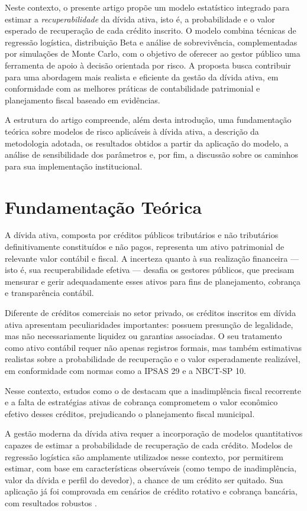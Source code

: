 \documentclass[a4paper,12pt]{article}
\begin{document}
Neste contexto, o presente artigo propõe um modelo estatístico integrado para estimar a \textit{recuperabilidade} da dívida ativa, isto é, a probabilidade e o valor esperado de recuperação de cada crédito inscrito. O modelo combina técnicas de regressão logística, distribuição Beta e análise de sobrevivência, complementadas por simulações de Monte Carlo, com o objetivo de oferecer ao gestor público uma ferramenta de apoio à decisão orientada por risco. A proposta busca contribuir para uma abordagem mais realista e eficiente da gestão da dívida ativa, em conformidade com as melhores práticas de contabilidade patrimonial e planejamento fiscal baseado em evidências.

A estrutura do artigo compreende, além desta introdução, uma fundamentação teórica sobre modelos de risco aplicáveis à dívida ativa, a descrição da metodologia adotada, os resultados obtidos a partir da aplicação do modelo, a análise de sensibilidade dos parâmetros e, por fim, a discussão sobre os caminhos para sua implementação institucional.


\section{Fundamentação Teórica}

A dívida ativa, composta por créditos públicos tributários e não tributários definitivamente constituídos e não pagos, representa um ativo patrimonial de relevante valor contábil e fiscal. A incerteza quanto à sua realização financeira — isto é, sua recuperabilidade efetiva — desafia os gestores públicos, que precisam mensurar e gerir adequadamente esses ativos para fins de planejamento, cobrança e transparência contábil.

Diferente de créditos comerciais no setor privado, os créditos inscritos em dívida ativa apresentam peculiaridades importantes: possuem presunção de legalidade, mas não necessariamente liquidez ou garantias associadas. O seu tratamento como ativo contábil requer não apenas registros formais, mas também estimativas realistas sobre a probabilidade de recuperação e o valor esperadamente realizável, em conformidade com normas como a IPSAS 29 e a NBCT-SP 10.

Nesse contexto, estudos como o de \cite{bonfim2024} destacam que a inadimplência fiscal recorrente e a falta de estratégias ativas de cobrança comprometem o valor econômico efetivo desses créditos, prejudicando o planejamento fiscal municipal.

A gestão moderna da dívida ativa requer a incorporação de modelos quantitativos capazes de estimar a probabilidade de recuperação de cada crédito. Modelos de regressão logística são amplamente utilizados nesse contexto, por permitirem estimar, com base em características observáveis (como tempo de inadimplência, valor da dívida e perfil do devedor), a chance de um crédito ser quitado. Sua aplicação já foi comprovada em cenários de crédito rotativo e cobrança bancária, com resultados robustos \cite{holck2019}.
\end{document}
